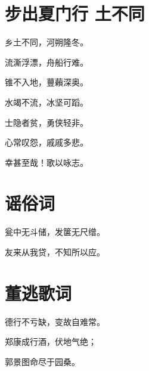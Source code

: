 \documentclass[12pt,a4paper]{ctexbook}
\begin{document}
\section{步出夏门行 土不同}
乡土不同，河朔隆冬。\par
流澌浮漂，舟船行难。\par
锥不入地，蘴藾深奥。\par
水竭不流，冰坚可蹈。\par
士隐者贫，勇侠轻非。\par
心常叹怨，戚戚多悲。\par
幸甚至哉！歌以咏志。\par

\section{谣俗词}
瓮中无斗储，发箧无尺缯。\par
友来从我贷，不知所以应。\par

\section{董逃歌词}
德行不亏缺，变故自难常。\par
郑康成行酒，伏地气绝；\par
郭景图命尽于园桑。\par
\end{document}
